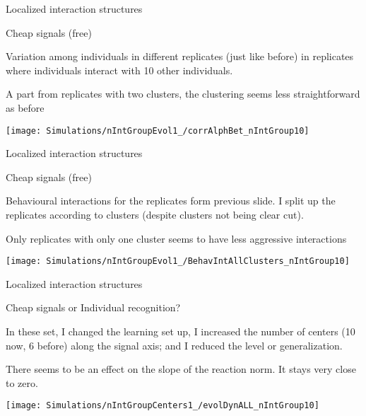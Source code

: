 \documentclass[
  ignorenonframetext,
]{beamer}
\begin{document}
\begin{frame}{Localized interaction structures}
\protect\hypertarget{localized-interaction-structures-1}{}

\begin{block}{Cheap signals (free)}

\small

Variation among individuals in different replicates (just like before)
in replicates where individuals interact with 10 other individuals.

A part from replicates with two clusters, the clustering seems less
straightforward as before

\begin{center}\texttt{[image: Simulations/nIntGroupEvol1\_/corrAlphBet\_nIntGroup10]} \end{center}

\end{block}

\end{frame}

\begin{frame}{Localized interaction structures}
\protect\hypertarget{localized-interaction-structures-2}{}

\begin{block}{Cheap signals (free)}

\small

Behavioural interactions for the replicates form previous slide. I split
up the replicates according to clusters (despite clusters not being
clear cut).

Only replicates with only one cluster seems to have less aggressive
interactions

\begin{center}\texttt{[image: Simulations/nIntGroupEvol1\_/BehavIntAllClusters\_nIntGroup10]} \end{center}

\end{block}

\end{frame}

\begin{frame}{Localized interaction structures}
\protect\hypertarget{localized-interaction-structures-3}{}

\begin{block}{Cheap signals or Individual recognition?}

\tiny

In these set, I changed the learning set up, I increased the number of
centers (10 now, 6 before) along the signal axis; and I reduced the
level or generalization.

There seems to be an effect on the slope of the reaction norm. It stays
very close to zero.

\begin{center}\texttt{[image: Simulations/nIntGroupCenters1\_/evolDynALL\_nIntGroup10]} \end{center}

\end{block}

\end{frame}
\end{document}
